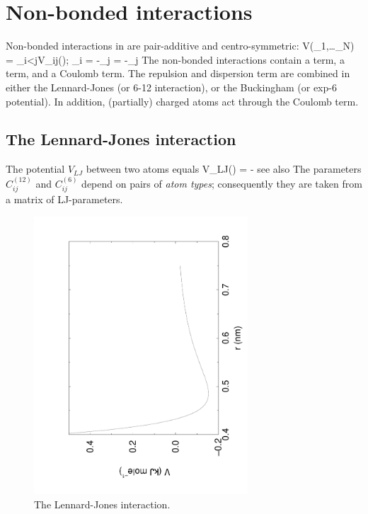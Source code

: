 \section{Non-bonded interactions}
Non-bonded interactions in {\gromacs} are pair-additive and centro-symmetric:
\beq
V(_1,\ldots {}_N) = \sum_{i<j}V_{ij}(\rvij);
\eeq
\beq
{}_i = -\sum_j   = -_j
\eeq
The non-bonded interactions contain a  term, 
a 
term, and a Coulomb term. The repulsion and dispersion term are
combined in either the Lennard-Jones (or 6-12 interaction), or the
Buckingham (or exp-6 potential). In addition, (partially) charged atoms
act through the Coulomb term. 

\subsection{The Lennard-Jones interaction}
\label{sec:lj}
The  potential $V_{LJ}$ between two atoms equals
\beq
V_{LJ}(\rij) =   -
\eeq
see also 
The parameters $C^{(12)}_{ij}$ and $C^{(6)}_{ij}$  depend on pairs of
{\em atom types}; consequently they are taken from a matrix of
LJ-parameters.

\begin{figure}
\centerline{\includegraphics[angle=270,width=8cm]{plots/f_lj}}
\caption {The Lennard-Jones interaction.}
\label{fig:lj}
\end{figure}
 
